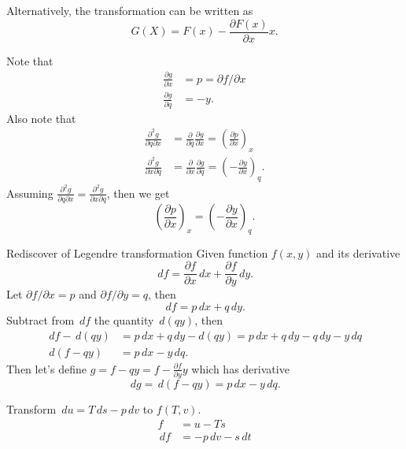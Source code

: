\documentclass[11pt,a4paper,fleqn]{article}
\newcommand{\D}{\ensuremath{\,d}}
\begin{document}
Alternatively, the transformation can be written as
\begin{equation}
  G(X) = F(x) - \frac{\partial F(x)}{\partial x} x.
\end{equation}

Note that
\begin{align}
  \frac{\partial g}{\partial x} &= p =  \partial f / \partial x \\
  \frac{\partial g}{\partial q} &= -y.
\end{align}
Also note that
\begin{align}
  \frac{\partial^2 g}{\partial q\partial x} &= \frac{\partial}{\partial q} \frac{\partial g}{\partial x} = \left(\frac{\partial p}{\partial x}\right)_x \\
  \frac{\partial^2 g}{\partial x \partial q} &= \frac{\partial}{\partial x} \frac{\partial g}{\partial q}= \left(- \frac{\partial y}{\partial x}\right)_q.
\end{align}
Assuming $\frac{\partial^2 g}{\partial q\partial x} = \frac{\partial^2 g}{\partial x \partial q}$, then we get
\begin{equation}
  \left(\frac{\partial p}{\partial x}\right)_x =  \left(- \frac{\partial y}{\partial x}\right)_q.
\end{equation}
\begin{fact}{Rediscover of Legendre transformation}{}
  Given function $f(x,y)$ and its derivative
  \begin{equation}
    \D f=\frac{\partial f}{\partial x}\D x + \frac{\partial f}{\partial y}\D y.
  \end{equation}
  Let $\partial f / \partial x = p$ and $\partial f / \partial y = q$, then
  \begin{equation}
    \D f = p \D x + q \D y.
  \end{equation}
  Subtract from $\D f$ the quantity $\D (qy)$, then
  \begin{align}
    \D f - \D (qy) &= p \D x + q \D y - d(qy) = p \D x + q \D y - q \D y - y \D q \\
    \D (f-qy) &= p \D x - y \D q.
  \end{align}
  Then let's define $g = f-qy = f - \frac{\partial f}{\partial y} y$ which has derivative
  \begin{equation}
     \D g = \D (f-qy) = p \D x - y \D q.
  \end{equation}
\end{fact}

\begin{exec}
  Transform $\D u = T \D s  - p \D v$ to  $f(T,v)$.
  \tcblower
  \begin{align}
        f&=u-Ts\\
    \D f &= -p \D v - s \D t
  \end{align}
\end{exec}
\end{document}
